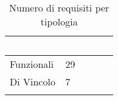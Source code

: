 {
    \setlength{\freewidth}{\dimexpr\textwidth-10\tabcolsep}
    \renewcommand{\arraystretch}{1.5}
    \centering
    \setlength{\aboverulesep}{0pt}
    \setlength{\belowrulesep}{0pt}
    \begin{longtable}{C{.25\freewidth} C{.2\freewidth}} 
       \toprule
    \textcolor{white}{\textbf{Tipologia}}&
    \textcolor{white}{\textbf{Quantità}}\\
    \toprule
    \endhead

    Funzionali & 29\\
    Di Vincolo & 7\\
    \bottomrule
    \caption{Numero di requisiti per tipologia}
    \label{tab:requisiti-tipolgia}
    \end{longtable}
}
